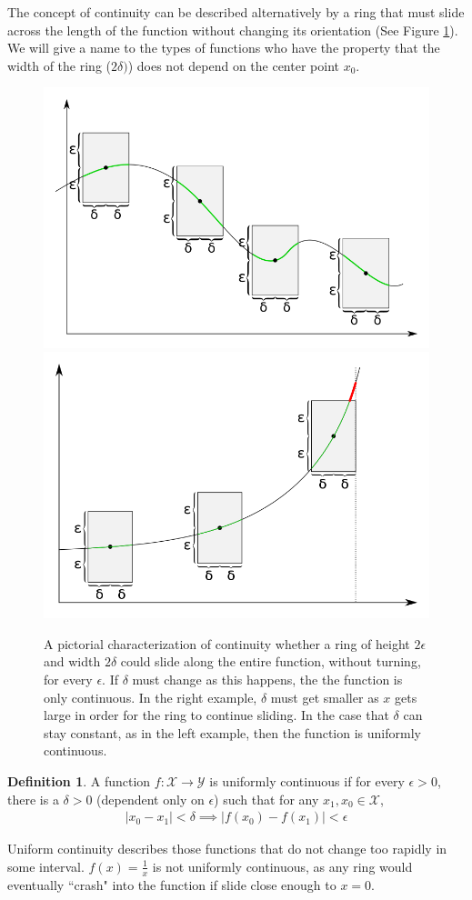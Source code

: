 \documentclass[11pt]{article}
\newcommand{\X}{\ensuremath{\mathcal X}}
\newcommand{\Y}{\ensuremath{\mathcal Y}}
\newcommand{\e}{\epsilon}
\theoremstyle{plain}
\theoremstyle{definition}
\newtheorem{defi}{Definition}[section]
\theoremstyle{remark}
\begin{document}
The concept of continuity can be described alternatively by a ring that must slide across the length of the function without changing its orientation (See Figure \ref{fig:cont}). We will give a name to the types of functions who have the property that the width of the ring ($2\delta)$) does not depend on the center point $x_0$.
\begin{figure}
    \centering
    \includegraphics[width=0.494\linewidth]{figures/uniform.png}
    \includegraphics[width=0.494\linewidth]{figures/not_uniform.png}
    \caption{A pictorial characterization of continuity whether a ring of height $2\e$ and width $2\delta$ could slide along the entire function, without turning, for every $\e$. If $\delta$ must change as this happens, the the function is only continuous. In the right example, $\delta$ must get smaller as $x$ gets large in order for the ring to continue sliding. In the case that $\delta$ can stay constant, as in the left example, then the function is uniformly continuous.}
    \label{fig:cont}
\end{figure}
\begin{defi}
    A function $f: \X \rightarrow \Y$ is uniformly continuous if for every $\e > 0$, there is a $\delta > 0$ (dependent only on $\e$) such that for any $x_1, x_0 \in \X$,
    \begin{align*}
        |x_0 - x_1| < \delta \implies |f(x_0) - f(x_1)| < \e
    \end{align*}
\end{defi}
Uniform continuity describes those functions that do not change too rapidly in some interval. $f(x) = \frac{1}{x}$ is not uniformly continuous, as any ring would eventually ``crash" into the function if slide close enough to $x = 0$.
\end{document}
